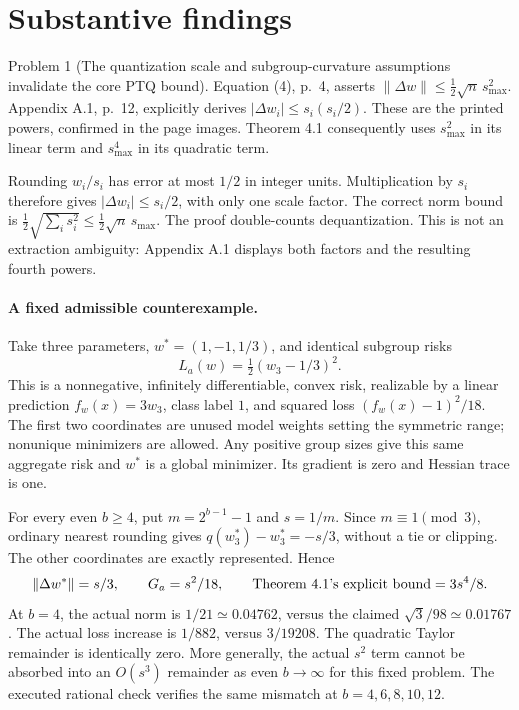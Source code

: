 \documentclass[10pt]{article}
\begin{document}
\section*{Substantive findings}
Problem 1 (The quantization scale and subgroup-curvature assumptions invalidate the core PTQ bound).  Equation (4), p. 4, asserts \(\|\Delta w\|\le\frac12\sqrt n\,s_{\max}^2\). Appendix A.1, p. 12, explicitly derives \(|\Delta w_i|\le s_i(s_i/2)\). These are the printed powers, confirmed in the page images. Theorem 4.1 consequently uses \(s_{\max}^2\) in its linear term and \(s_{\max}^4\) in its quadratic term.\par
Rounding \(w_i/s_i\) has error at most \(1/2\) in integer units. Multiplication by \(s_i\) therefore gives \(|\Delta w_i|\le s_i/2\), with only one scale factor. The correct norm bound is \(\frac12\sqrt{\sum_i s_i^2}\le\frac12\sqrt n\,s_{\max}\). The proof double-counts dequantization. This is not an extraction ambiguity: Appendix A.1 displays both factors and the resulting fourth powers.\par
\paragraph*{A fixed admissible counterexample.}\mbox{}\par
Take three parameters, \(w^*=(1,-1,1/3)\), and identical subgroup risks \[L_a(w)=\tfrac12(w_3-1/3)^2.\] This is a nonnegative, infinitely differentiable, convex risk, realizable by a linear prediction \(f_w(x)=3w_3\), class label \(1\), and squared loss \((f_w(x)-1)^2/18\). The first two coordinates are unused model weights setting the symmetric range; nonunique minimizers are allowed. Any positive group sizes give this same aggregate risk and \(w^*\) is a global minimizer. Its gradient is zero and Hessian trace is one.\par
For every even \(b\ge4\), put \(m=2^{b-1}-1\) and \(s=1/m\). Since \(m\equiv1\pmod3\), ordinary nearest rounding gives \(q(w_3^*)-w_3^*=-s/3\), without a tie or clipping. The other coordinates are exactly represented. Hence \[\|\Delta w^*\|=s/3,\qquad G_a=s^2/18,
 \qquad\hbox{Theorem 4.1's explicit bound}=3s^4/8.\] At \(b=4\), the actual norm is \(1/21\simeq0.04762\), versus the claimed \(\sqrt3/98\simeq0.01767\). The actual loss increase is \(1/882\), versus \(3/19208\). The quadratic Taylor remainder is identically zero. More generally, the actual \(s^2\) term cannot be absorbed into an \(O(s^3)\) remainder as even \(b\to\infty\) for this fixed problem. The executed rational check verifies the same mismatch at \(b=4,6,8,10,12\).\par
\end{document}
